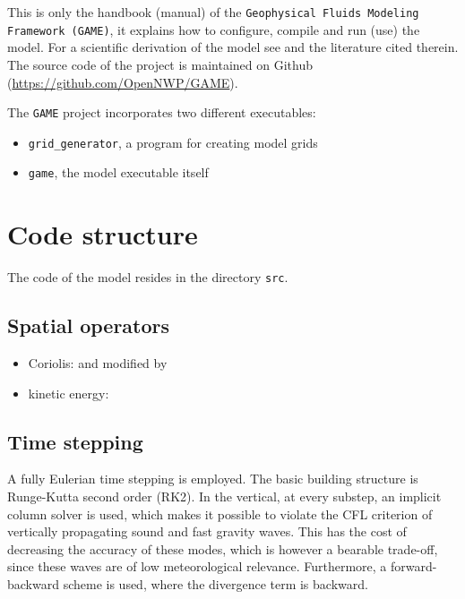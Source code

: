\documentclass[10pt]{report}
\begin{document}
This is only the handbook (manual) of the \texttt{Geophysical Fluids Modeling Framework (GAME)}, it explains how to configure, compile and run (use) the model. For a scientific derivation of the model see \cite{kompendium} and the literature cited therein. The source code of the project is maintained on Github (\url{https://github.com/OpenNWP/GAME}).

The \texttt{GAME} project incorporates two different executables:

\begin{itemize}
\item \texttt{grid\_generator}, a program for creating model grids
\item \texttt{game}, the model executable itself
\end{itemize}

\chapter{Code structure}
\label{chap:code_structure}

The code of the model resides in the directory \texttt{src}.

\section{Spatial operators}
\label{sec:spatial_operators}

\begin{itemize}
\item Coriolis: \cite{thuburn_f_discrete_plane} and \cite{ringler_trsk} modified by \cite{doi:10.1002/qj.3294}
\item kinetic energy: \cite{doi:10.1002/qj.1960}
\end{itemize}

\section{Time stepping}
\label{sec:time_stepping}

A fully Eulerian time stepping is employed. The basic building structure is Runge-Kutta second order (RK2). In the vertical, at every substep, an implicit column solver is used, which makes it possible to violate the CFL criterion of vertically propagating sound and fast gravity waves. This has the cost of decreasing the accuracy of these modes, which is however a bearable trade-off, since these waves are of low meteorological relevance. Furthermore, a forward-backward scheme is used, where the divergence term is backward.
\end{document}
